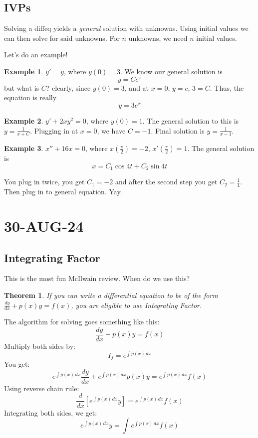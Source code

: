 \documentclass{article}
\newtheorem{thm}{Theorem}
\theoremstyle{definition}
\newtheorem{example}{Example}[section]
\begin{document}
 \subsection{IVPs}
 Solving a diffeq yields a \textit{general} solution with unknowns. Using initial values we can then solve for said unknowns. For $n$ unknowns, we need $n$ initial values. 

 Let's do an example!
 \begin{example}
    $y' = y$, where $y(0) = 3$.
    We know our general solution is 
    \[y = Ce^x\]
    but what is $C$?
    clearly, since $y(0) = 3$, and at $x = 0$, $y=c$, $3 = C$. Thus, the equation is really 
    \[y = 3e^x\]
 \end{example}
 \begin{example}
    $y' + 2xy^2 = 0$, where $y(0)=1$.
    The general solution to this is $y = \frac{1}{x+C}$. Plugging in at $x=0$, we have $C=-1$. Final solution is $y = \frac{1}{x-1}$.
 \end{example}
 \begin{example}
    $x'' + 16x = 0$, where $x(\frac{\pi}{2})= -2$, $x'(\frac{\pi}{2}) = 1$. The general solution is 
    \[x = C_1\cos{4t}+C_2\sin{4t}\]

    You plug in twice, you get $C_1 = -2$ and after the second step you get $C_2 = \frac{1}{4}$. Then plug in to general equation. Yay.
\end{example}
\section{30-AUG-24}
\subsection{Integrating Factor}
This is the most fun McIlwain review. When do we use this?
\begin{thm}
    If you can write a differential equation to be of the form $\frac{dy}{dx} + p(x)y = f(x)$, you are eligible to use Integrating Factor.
\end{thm}

The algorithm for solving goes something like this:
\[
\frac{dy}{dx} + p(x)y = f(x)
\]
Multiply both sides by:
\[
I_f = e^{\int{p(x) \, dx}}
\]
You get:
\[
e^{\int{p(x) \, dx}} \frac{dy}{dx} + e^{\int{p(x) \, dx}} p(x) y = e^{\int{p(x) \, dx}} f(x)
\]
Using reverse chain rule:
\[
\frac{d}{dx}[e^{\int{p(x) \, dx}}y]= e^{\int{p(x) \, dx}} f(x)
\]
Integrating both sides, we get:
\[
    e^{\int{p(x) \, dx}}y = \int{e^{\int{p(x) \, dx}} f(x)}
\]
\end{document}
